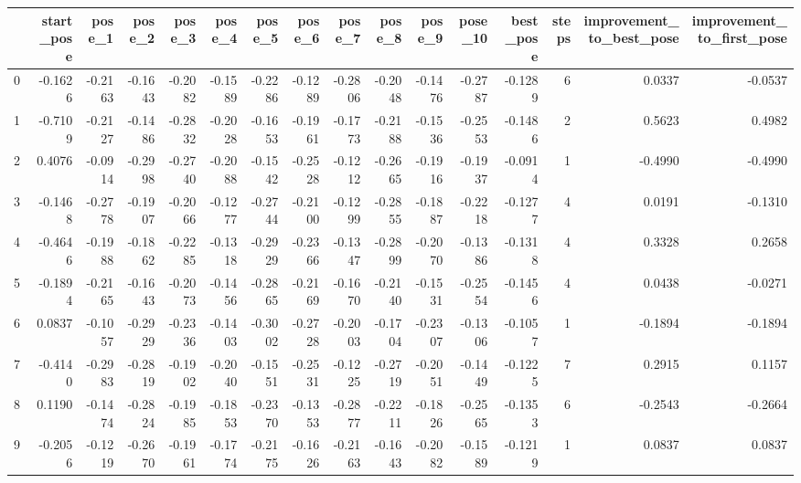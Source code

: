 \begin{tabular}{lrrrrrrrrrrrrrrr}
\toprule
{} &  start\_pose &  pose\_1 &  pose\_2 &  pose\_3 &  pose\_4 &  pose\_5 &  pose\_6 &  pose\_7 &  pose\_8 &  pose\_9 &  pose\_10 &  best\_pose &  steps &  improvement\_to\_best\_pose &  improvement\_to\_first\_pose \\
\midrule
0 &     -0.1626 & -0.2163 & -0.1643 & -0.2082 & -0.1589 & -0.2286 & -0.1289 & -0.2806 & -0.2048 & -0.1476 &  -0.2787 &    -0.1289 &      6 &                    0.0337 &                    -0.0537 \\
1 &     -0.7109 & -0.2127 & -0.1486 & -0.2832 & -0.2028 & -0.1653 & -0.1961 & -0.1773 & -0.2188 & -0.1536 &  -0.2553 &    -0.1486 &      2 &                    0.5623 &                     0.4982 \\
2 &      0.4076 & -0.0914 & -0.2998 & -0.2740 & -0.2088 & -0.1542 & -0.2528 & -0.1212 & -0.2665 & -0.1916 &  -0.1937 &    -0.0914 &      1 &                   -0.4990 &                    -0.4990 \\
3 &     -0.1468 & -0.2778 & -0.1907 & -0.2066 & -0.1277 & -0.2744 & -0.2100 & -0.1299 & -0.2855 & -0.1887 &  -0.2218 &    -0.1277 &      4 &                    0.0191 &                    -0.1310 \\
4 &     -0.4646 & -0.1988 & -0.1862 & -0.2285 & -0.1318 & -0.2929 & -0.2366 & -0.1347 & -0.2899 & -0.2070 &  -0.1386 &    -0.1318 &      4 &                    0.3328 &                     0.2658 \\
5 &     -0.1894 & -0.2165 & -0.1643 & -0.2073 & -0.1456 & -0.2865 & -0.2169 & -0.1670 & -0.2140 & -0.1531 &  -0.2554 &    -0.1456 &      4 &                    0.0438 &                    -0.0271 \\
6 &      0.0837 & -0.1057 & -0.2929 & -0.2336 & -0.1403 & -0.3002 & -0.2728 & -0.2003 & -0.1704 & -0.2307 &  -0.1306 &    -0.1057 &      1 &                   -0.1894 &                    -0.1894 \\
7 &     -0.4140 & -0.2983 & -0.2819 & -0.1902 & -0.2040 & -0.1551 & -0.2531 & -0.1225 & -0.2719 & -0.2051 &  -0.1449 &    -0.1225 &      7 &                    0.2915 &                     0.1157 \\
8 &      0.1190 & -0.1474 & -0.2824 & -0.1985 & -0.1853 & -0.2370 & -0.1353 & -0.2877 & -0.2211 & -0.1826 &  -0.2565 &    -0.1353 &      6 &                   -0.2543 &                    -0.2664 \\
9 &     -0.2056 & -0.1219 & -0.2670 & -0.1961 & -0.1774 & -0.2175 & -0.1626 & -0.2163 & -0.1643 & -0.2082 &  -0.1589 &    -0.1219 &      1 &                    0.0837 &                     0.0837 \\
\bottomrule
\end{tabular}
